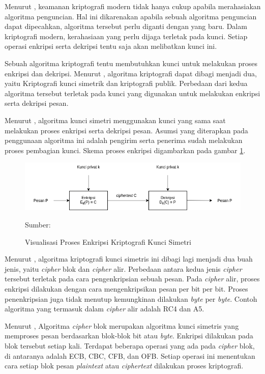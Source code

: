 Menurut \textcite{schneier1996}, keamanan kriptografi modern tidak hanya cukup apabila merahasiakan algoritma penguncian. Hal ini dikarenakan apabila sebuah algoritma penguncian dapat dipecahkan, algoritma tersebut perlu diganti dengan yang baru. Dalam kriptografi modern, kerahasiaan yang perlu dijaga terletak pada kunci. Setiap operasi enkripsi serta dekripsi tentu saja akan melibatkan kunci ini. 

Sebuah algoritma kriptografi tentu membutuhkan kunci untuk melakukan proses enkripsi dan dekripsi. Menurut \textcite{schneier1996}, algoritma kriptografi dapat dibagi menjadi dua, yaitu Kriptografi kunci simetrik dan kriptografi publik. Perbedaan dari kedua algoritma tersebut terletak pada kunci yang digunakan untuk melakukan enkripsi serta dekripsi pesan. 

Menurut \textcite{munir2019}, algoritma kunci simetri menggunakan kunci yang sama saat melakukan proses enkripsi serta dekripsi pesan. Asumsi yang diterapkan pada penggunaan algoritma ini adalah pengirim serta penerima sudah melakukan proses pembagian kunci. Skema proses enkripsi digambarkan pada gambar \ref{fig:crypto.symetric}.

\begin{figure}[!h]
  \centering
  \includegraphics[width=\textwidth]{chapters/res/chapter-2/img/crypto.symetric.png}
  \caption{Visualisasi Proses Enkripsi Kriptografi Kunci Simetri} \label{fig:crypto.symetric}
  Sumber: \textcite{munir2019}
\end{figure}

Menurut \textcite{munir2019}, algoritma kriptografi kunci simetris ini dibagi lagi menjadi dua buah jenis, yaitu \emph{cipher} blok dan \emph{cipher} alir. Perbedaan antara kedua jenis \emph{cipher} tersebut terletak pada cara pengenkripsian sebuah pesan. Pada \emph{cipher} alir, proses enkripsi dilakukan dengan cara mengenkripsikan pesan per bit per bit. Proses penenkripsian juga tidak menutup kemungkinan dilakukan \emph{byte} per \emph{byte}. Contoh algoritma yang termasuk dalam \emph{cipher} alir adalah RC4 dan A5.

Menurut \textcite{munir2019}, Algoritma \emph{cipher} blok merupakan algoritma kunci simetris yang memproses pesan berdasarkan blok-blok bit atau \emph{byte}. Enkripsi dilakukan pada blok tersebut setiap kali. Terdapat beberapa operasi yang ada pada \emph{cipher} blok, di antaranya adalah ECB, CBC, CFB, dan OFB. Setiap operasi ini menentukan cara setiap blok pesan \emph{plaintext} atau \emph{ciphertext} dilakukan proses kriptografi.

